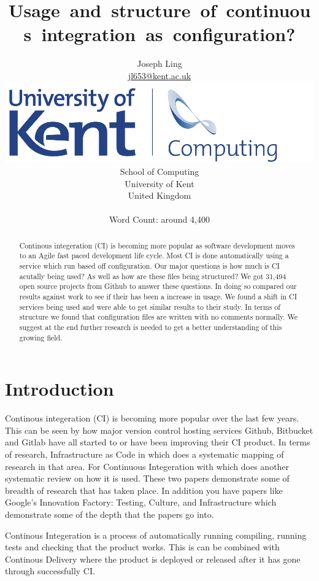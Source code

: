 \documentclass[twoside,12pt,titlepage,a4paper]{article}
\title{Usage and structure of continuous integration as configuration?}
\author{Joseph Ling\\\vspace{10mm}
\url{jl653@kent.ac.uk} \\ \vspace{5mm}
\includegraphics[scale=0.6]{Kent_Comp_294_RGB} \\
School of Computing \\
University of Kent \\
United Kingdom \\ \vspace{10mm} \\ Word Count: around 4,400}
\begin{document}
\maketitle
\restoregeometry              %

\begin{abstract}
  Continous integeration (CI) is becoming more popular as software development moves to an Agile fast paced development life cycle. Most CI is done automatically using a service which run based off configuration. Our major questions is how much is CI acutally being used? As well as how are these files being structured? We got 31,494 open source projects from Github to answer these questions. In doing so compared our results against \citet{Hilton2016} work to see if their has been a increase in usage. We found a shift in CI services being used and were able to get similar results to their study. In terms of structure we found that configuration files are written with no comments normally. We suggest at the end further research is needed to get a better understanding of this growing field.    
\end{abstract}

\section{Introduction}
\label{Introduction}

Continous integeration (CI) is becoming more popular over the last few years. This can be seen by how major version control hosting services Github, Bitbucket and Gitlab have all started to or have been improving their CI product. In terms of research, Infrastructure as Code in \citet{Rahman2019} which does a systematic mapping of research in that area. For Continuous Integeration with \citet{Shahin2017} which does another systematic review on how it is used. These two papers demonstrate some of breadth of research that has taken place. In addition you have papers like Google's Innovation Factory: Testing, Culture, and Infrastructure \citet{Copeland2010} which demonstrate some of the depth that the papers go into.

Continous Integeration is a process of automatically running compiling, running tests and checking that the product works. This is can be combined with Continous Delivery where the product is deployed or released after it has gone through successfully CI. 
\end{document}
